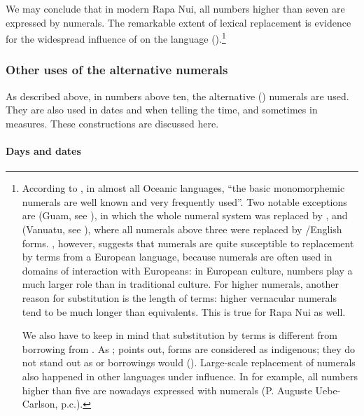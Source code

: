 We may conclude that in modern Rapa Nui, all numbers higher than seven are expressed by  numerals. The remarkable extent of lexical replacement is evidence for the widespread influence of  on the language ().\footnote{\label{fn:171}According to \citet[37]{LynchSpriggs1995}, in almost all Oceanic languages, “the basic monomorphemic numerals are well known and very frequently used”. Two notable exceptions are  (Guam, see \citealt[166]{Topping1973}), in which the whole numeral system was replaced by , and  (Vanuatu, see \citealt{LynchSpriggs1995}), where all numerals above three were replaced by /English forms. \citet{Clark2004}, however, suggests that numerals are quite susceptible to replacement by terms from a European language, because numerals are often used in domains of interaction with Europeans: in European culture, numbers play a much larger role than in traditional culture. For higher numerals, another reason for substitution is the length of terms: higher vernacular numerals tend to be much longer than  equivalents. This is true for Rapa Nui as well. 

We also have to keep in mind that substitution by  terms is different from borrowing from . As \citet[397]{Fischer2007}; \citet[151]{Fischer2008Reversing} points out,  forms are considered as indigenous; they do not stand out as  or  borrowings would (). Large-scale replacement of numerals also happened in other languages under  influence. In  for example, all numbers higher than five are nowadays expressed with  numerals (P. Auguste Uebe-Carlson, p.c.).}

\subsubsection[Other uses of the alternative numerals]{Other uses of the alternative numerals}\label{sec:4.3.1.1}

As described above, in numbers above ten, the alternative () numerals are used. They are also used in dates and when telling the time, and sometimes in measures. These constructions are discussed here.

\paragraph[Days and dates]{Days and dates}\label{sec:4.3.1.1.1}

